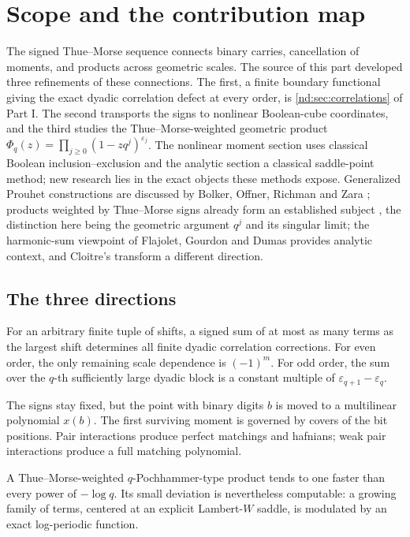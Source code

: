 \documentclass[11pt,a4paper,oneside,openany]{book}
\numberwithin{equation}{chapter}
\theoremstyle{definition}
\theoremstyle{remark}
\newcommand{\eps}{\varepsilon}
\begin{document}
\chapter{Scope and the contribution map}
\label{nd:sec:scope}
The signed Thue--Morse sequence connects binary carries, cancellation of
moments, and products across geometric scales. The source of this part
developed three refinements of these connections. The first, a finite
boundary functional giving the exact dyadic correlation defect at every
order, is \cref{nd:sec:correlations} of Part I. The second transports the
signs to nonlinear Boolean-cube coordinates, and the third studies the
Thue--Morse-weighted geometric product $\Phi_q(z)=\prod_{j\ge0}(1-zq^j)^{\eps_j}$.
The nonlinear moment section uses classical Boolean inclusion--exclusion and
the analytic section a classical saddle-point method; new research lies in
the exact objects these methods expose. Generalized Prouhet constructions
are discussed by Bolker, Offner, Richman and Zara \cite{bolker}; products
weighted by Thue--Morse signs already form an established subject
\cite{ars,li}, the distinction here being the geometric argument $q^j$ and
its singular limit; the harmonic-sum viewpoint of Flajolet, Gourdon and
Dumas \cite{fgd} provides analytic context, and Cloitre's transform
\cite{cloitre} a different direction.


\section{The three directions}
\begin{description}[leftmargin=0pt,labelsep=0.7em]
\item[Boundary defects.] For an arbitrary finite tuple of shifts, a signed sum
of at most as many terms as the largest shift determines all finite dyadic
correlation corrections. For even order, the only remaining scale dependence
is \((-1)^m\). For odd order, the sum over the \(q\)-th sufficiently large dyadic
block is a constant multiple of \(\eps_{q+1}-\eps_q\).
\item[Nonlinear Prouhet geometry.] The signs stay fixed, but the point with
binary digits \(b\) is moved to a multilinear polynomial \(x(b)\). The first
surviving moment is governed by covers of the bit positions. Pair interactions
produce perfect matchings and hafnians; weak pair interactions produce a full
matching polynomial.
\item[Flat automatic products.] A Thue--Morse-weighted \(q\)-Pochhammer-type
product tends to one faster than every power of \(-\log q\). Its small deviation
is nevertheless computable: a growing family of terms, centered at an explicit
Lambert-\(W\) saddle, is modulated by an exact log-periodic function.
\end{description}
\end{document}
